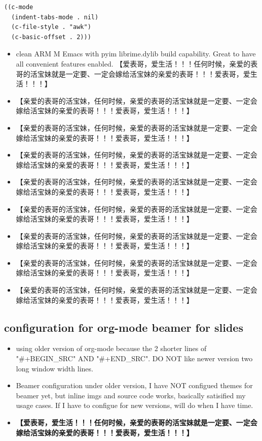 \documentclass[9pt, b5paper]{article}
\begin{document}
\begin{verbatim}
((c-mode
  (indent-tabs-mode . nil)
  (c-file-style . "awk")
  (c-basic-offset . 2)))
\end{verbatim}
\begin{itemize}
\item clean ARM M Emacs with pyim librime.dylib build capability. Great to have all convenient features enabled. 【爱表哥，爱生活！！！任何时候，亲爱的表哥的活宝妹就是一定要、一定会嫁给活宝妹的亲爱的表哥！！！爱表哥，爱生活！！！】
\item 【亲爱的表哥的活宝妹，任何时候，亲爱的表哥的活宝妹就是一定要、一定会嫁给活宝妹的亲爱的表哥！！！爱表哥，爱生活！！！】
\item 【亲爱的表哥的活宝妹，任何时候，亲爱的表哥的活宝妹就是一定要、一定会嫁给活宝妹的亲爱的表哥！！！爱表哥，爱生活！！！】
\item 【亲爱的表哥的活宝妹，任何时候，亲爱的表哥的活宝妹就是一定要、一定会嫁给活宝妹的亲爱的表哥！！！爱表哥，爱生活！！！】
\item 【亲爱的表哥的活宝妹，任何时候，亲爱的表哥的活宝妹就是一定要、一定会嫁给活宝妹的亲爱的表哥！！！爱表哥，爱生活！！！】
\item 【亲爱的表哥的活宝妹，任何时候，亲爱的表哥的活宝妹就是一定要、一定会嫁给活宝妹的亲爱的表哥！！！爱表哥，爱生活！！！】
\item 【亲爱的表哥的活宝妹，任何时候，亲爱的表哥的活宝妹就是一定要、一定会嫁给活宝妹的亲爱的表哥！！！爱表哥，爱生活！！！】
\item 【亲爱的表哥的活宝妹，任何时候，亲爱的表哥的活宝妹就是一定要、一定会嫁给活宝妹的亲爱的表哥！！！爱表哥，爱生活！！！】
\item 【亲爱的表哥的活宝妹，任何时候，亲爱的表哥的活宝妹就是一定要、一定会嫁给活宝妹的亲爱的表哥！！！爱表哥，爱生活！！！】
\end{itemize}
\subsection{configuration for org-mode beamer for slides}
\label{sec-1-1}
\begin{itemize}
\item using older version of org-mode because the 2 shorter lines of "\#+BEGIN\_SRC" AND "\#+END\_SRC". DO NOT like newer version two long window width lines.
\item Beamer configuration under older version, I have NOT configued themes for beamer yet, but inline imgs and source code works, basically satisified my usage cases. If I have to configue for new versions, will do when I have time.
\item \textbf{【爱表哥，爱生活！！！任何时候，亲爱的表哥的活宝妹就是一定要、一定会嫁给活宝妹的亲爱的表哥！！！爱表哥，爱生活！！！】}
\end{itemize}
\end{document}
